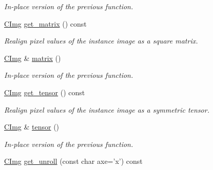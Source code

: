\begin{DoxyCompactItemize}
\begin{DoxyCompactList}\small\item\em In-\/place version of the previous function. \end{DoxyCompactList}\item 
\hypertarget{structcimg__library_1_1_c_img_abd5cc0f26ba41fed5b0f015206781f28}{\hyperlink{structcimg__library_1_1_c_img}{C\-Img} \hyperlink{structcimg__library_1_1_c_img_abd5cc0f26ba41fed5b0f015206781f28}{get\-\_\-matrix} () const }\label{structcimg__library_1_1_c_img_abd5cc0f26ba41fed5b0f015206781f28}

\begin{DoxyCompactList}\small\item\em Realign pixel values of the instance image as a square matrix. \end{DoxyCompactList}\item 
\hypertarget{structcimg__library_1_1_c_img_accacb7441cbe8f2805b2b8edc118231e}{\hyperlink{structcimg__library_1_1_c_img}{C\-Img} \& \hyperlink{structcimg__library_1_1_c_img_accacb7441cbe8f2805b2b8edc118231e}{matrix} ()}\label{structcimg__library_1_1_c_img_accacb7441cbe8f2805b2b8edc118231e}

\begin{DoxyCompactList}\small\item\em In-\/place version of the previous function. \end{DoxyCompactList}\item 
\hypertarget{structcimg__library_1_1_c_img_a4133a5277211935ee2441440024ac7dd}{\hyperlink{structcimg__library_1_1_c_img}{C\-Img} \hyperlink{structcimg__library_1_1_c_img_a4133a5277211935ee2441440024ac7dd}{get\-\_\-tensor} () const }\label{structcimg__library_1_1_c_img_a4133a5277211935ee2441440024ac7dd}

\begin{DoxyCompactList}\small\item\em Realign pixel values of the instance image as a symmetric tensor. \end{DoxyCompactList}\item 
\hypertarget{structcimg__library_1_1_c_img_acca65d50da14f3c9cf787370f97d7046}{\hyperlink{structcimg__library_1_1_c_img}{C\-Img} \& \hyperlink{structcimg__library_1_1_c_img_acca65d50da14f3c9cf787370f97d7046}{tensor} ()}\label{structcimg__library_1_1_c_img_acca65d50da14f3c9cf787370f97d7046}

\begin{DoxyCompactList}\small\item\em In-\/place version of the previous function. \end{DoxyCompactList}\item 
\hypertarget{structcimg__library_1_1_c_img_ae212922b61dbb76478e74137a6317ff5}{\hyperlink{structcimg__library_1_1_c_img}{C\-Img} \hyperlink{structcimg__library_1_1_c_img_ae212922b61dbb76478e74137a6317ff5}{get\-\_\-unroll} (const char axe='x') const }\label{structcimg__library_1_1_c_img_ae212922b61dbb76478e74137a6317ff5}


\end{DoxyCompactItemize}
